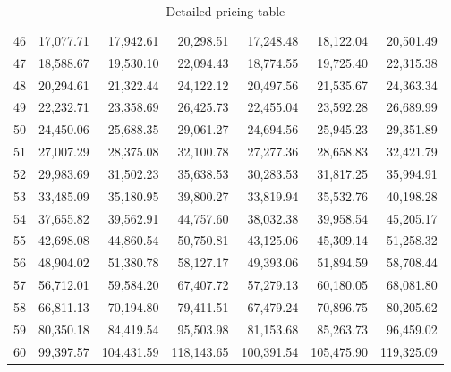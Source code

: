 \documentclass[12pt]{article}
\begin{document}
\begin{table}[ht]
\begin{tabular}{|r|rrr|rrr|}
46 & 17,077.71 & 17,942.61 & 20,298.51 & 17,248.48 & 18,122.04 & 20,501.49 \\
47 & 18,588.67 & 19,530.10 & 22,094.43 & 18,774.55 & 19,725.40 & 22,315.38 \\
48 & 20,294.61 & 21,322.44 & 24,122.12 & 20,497.56 & 21,535.67 & 24,363.34 \\
49 & 22,232.71 & 23,358.69 & 26,425.73 & 22,455.04 & 23,592.28 & 26,689.99 \\
50 & 24,450.06 & 25,688.35 & 29,061.27 & 24,694.56 & 25,945.23 & 29,351.89 \\
51 & 27,007.29 & 28,375.08 & 32,100.78 & 27,277.36 & 28,658.83 & 32,421.79 \\
52 & 29,983.69 & 31,502.23 & 35,638.53 & 30,283.53 & 31,817.25 & 35,994.91 \\
53 & 33,485.09 & 35,180.95 & 39,800.27 & 33,819.94 & 35,532.76 & 40,198.28 \\
54 & 37,655.82 & 39,562.91 & 44,757.60 & 38,032.38 & 39,958.54 & 45,205.17 \\
55 & 42,698.08 & 44,860.54 & 50,750.81 & 43,125.06 & 45,309.14 & 51,258.32 \\
56 & 48,904.02 & 51,380.78 & 58,127.17 & 49,393.06 & 51,894.59 & 58,708.44 \\
57 & 56,712.01 & 59,584.20 & 67,407.72 & 57,279.13 & 60,180.05 & 68,081.80 \\
58 & 66,811.13 & 70,194.80 & 79,411.51 & 67,479.24 & 70,896.75 & 80,205.62 \\
59 & 80,350.18 & 84,419.54 & 95,503.98 & 81,153.68 & 85,263.73 & 96,459.02 \\
60 & 99,397.57 & 104,431.59 & 118,143.65 & 100,391.54 & 105,475.90 & 119,325.09 \\
   \hline
\end{tabular}
\caption{Detailed pricing table}
\end{table}
\end{document}
